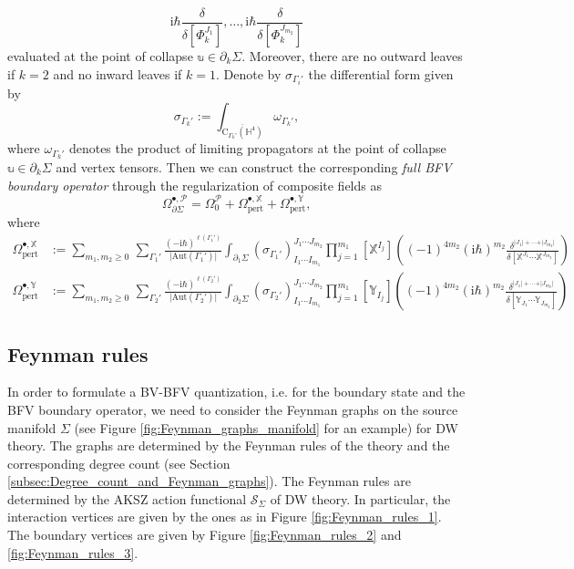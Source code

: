 \documentclass[11pt,colorinlistoftodos]{amsart}
\numberwithin{equation}{subsection}
\theoremstyle{plain}
\theoremstyle{definition}
\theoremstyle{remark}
\newcommand{\de}{\partial}
\newcommand{\calS}{\mathcal{S}}
\newcommand{\calP}{\mathcal{P}}
\newcommand{\I}{\mathrm{i}}
\begin{document}
\[
\I\hbar\frac{\delta}{\delta\left[\Phi^{J_1}_k\right]},\ldots,\I\hbar\frac{\delta}{\delta\left[\Phi^{J_{m_2}}_k\right]}
\]
evaluated at the point of collapse $\mathbb{u}\in \de_k\Sigma$. Moreover, there are no outward leaves if $k=2$ and no inward leaves if $k=1$. Denote by $\sigma_{\Gamma_i'}$ the differential form given by 
\[
\sigma_{\Gamma_k'}:=\int_{\overline{\mathrm{C}_{\Gamma_k'}(\mathbb{H}^4)}}\omega_{\Gamma_k'},
\]
where $\omega_{\Gamma_k'}$ denotes the product of limiting propagators at the point of collapse $\mathbb{u}\in\de_k\Sigma$ and vertex tensors.
Then we can construct the corresponding \emph{full BFV boundary operator} through the regularization of composite fields as 
\begin{equation}
\label{eq:full_boundary_operator}
    \Omega^{\bullet,\calP}_{\de\Sigma}=\Omega^\calP_0+\Omega^{\bullet,\mathds{X}}_\mathrm{pert}+\Omega^{\bullet,\mathds{Y}}_\mathrm{pert},
\end{equation}
where 
\begin{align}
    \label{eq:principal_part_X}
    \Omega^{\bullet,\mathds{X}}_\mathrm{pert}&:=\sum_{m_1,m_2\geq 0}\,\sum_{\Gamma_1'}\frac{(-\I\hbar)^{\ell(\Gamma_1')}}{\vert\mathrm{Aut}(\Gamma_1')\vert}\int_{\de_1\Sigma}\left(\sigma_{\Gamma_1'}\right)^{J_1\dotsm J_{m_2}}_{I_1\dotsm I_{m_1}}\prod_{j=1}^{m_1}\left[\mathds{X}^{I_j}\right]\left((-1)^{4m_2}(\I\hbar)^{m_2}\frac{\delta^{\vert J_1\vert+\dotsm+\vert J_{m_2}\vert}}{\delta\left[\mathds{X}^{J_1}\dotsm \mathds{X}^{J_{m_2}}\right]}\right)\\
    \label{eq:principal_part_Y}
    \Omega^{\bullet,\mathds{Y}}_\mathrm{pert}&:=\sum_{m_1,m_2\geq 0}\,\sum_{\Gamma_2'}\frac{(-\I\hbar)^{\ell(\Gamma_2')}}{\vert\mathrm{Aut}(\Gamma_2')\vert}\int_{\de_2\Sigma}\left(\sigma_{\Gamma_2'}\right)^{J_1\dotsm J_{m_2}}_{I_1\dotsm I_{m_1}}\prod_{j=1}^{m_1}\left[\mathds{Y}_{I_j}\right]\left((-1)^{4m_2}(\I\hbar)^{m_2}\frac{\delta^{\vert J_1\vert+\dotsm+\vert J_{m_2}\vert}}{\delta\left[\mathds{Y}_{J_1}\dotsm \mathds{Y}_{J_{m_2}}\right]}\right)
\end{align}


\subsection{Feynman rules}
\label{subsec:Feynman_rules}
In order to formulate a BV-BFV quantization, i.e. for the boundary state and the BFV boundary operator, we need to consider the Feynman graphs on the source manifold $\Sigma$ (see Figure \ref{fig:Feynman_graphs_manifold} for an example) for DW theory. The graphs are determined by the Feynman rules of the theory and the corresponding degree count (see Section \ref{subsec:Degree_count_and_Feynman_graphs}).
The Feynman rules are determined by the AKSZ action functional $\calS_\Sigma$ of DW theory. In particular, the interaction vertices are given by the ones as in Figure \ref{fig:Feynman_rules_1}. The boundary vertices are given by Figure \ref{fig:Feynman_rules_2} and \ref{fig:Feynman_rules_3}.
\end{document}
